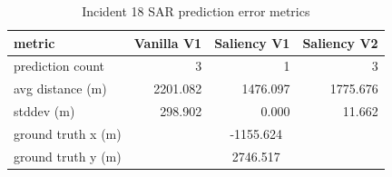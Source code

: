 \begin{table}[ht]
\centering
\caption{Incident 18 SAR prediction error metrics}
\label{tab:sar-incident-18}
\begin{tabular}{lrrr}
\hline
metric & Vanilla V1 & Saliency V1 & Saliency V2 \\
\hline
prediction count & 3 & 1 & 3 \\
avg distance (m) & 2201.082 & 1476.097 & 1775.676 \\
stddev (m) & 298.902 & 0.000 & 11.662 \\
ground truth x (m) & \multicolumn{3}{c}{-1155.624} \\
ground truth y (m) & \multicolumn{3}{c}{2746.517} \\
\hline
\end{tabular}
\end{table}

